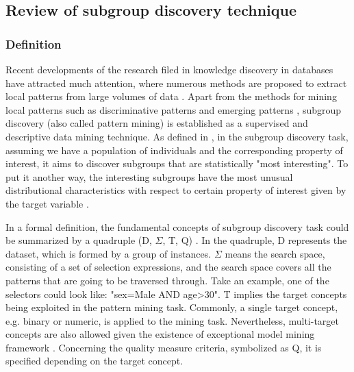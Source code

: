 \subsection{Review of subgroup discovery technique}

\subsubsection{Definition}
Recent developments of the research filed in knowledge discovery in databases have attracted much attention, where numerous methods are proposed to extract local patterns from large volumes of data  \cite{fayyad1996data}. Apart from the methods for mining local patterns such as discriminative patterns \cite{cheng2008direct} and emerging patterns \cite{dong1999efficient}, subgroup discovery (also called pattern mining) is established as a supervised and descriptive data mining technique. As defined in \cite{herrera2011overview}, in the subgroup discovery task, assuming we have a population of individuals and the corresponding property of interest, it aims to discover subgroups that are statistically "most interesting". To put it another way, the interesting subgroups have the most unusual distributional characteristics with respect to certain property of interest given by the target variable \cite{atzmueller2009fast}.

In a formal definition, the fundamental concepts of subgroup discovery task could be summarized by a quadruple (D, $\Sigma$, T, Q) \cite{lemmerich2014novel}. In the quadruple, D represents the dataset, which is formed by a group of instances. $\Sigma$ means the search space, consisting of a set of selection expressions, and the search space covers all the patterns that are going to be traversed through. Take an example, one of the selectors could look like: "sex=Male AND age>30". T implies the target concepts being exploited in the pattern mining task. Commonly, a single target concept, e.g. binary or numeric, is applied to the mining task. Nevertheless, multi-target concepts are also allowed given the existence of exceptional model mining framework \cite{leman2008exceptional}. Concerning the quality measure criteria, symbolized as Q, it is specified depending on the target concept.

